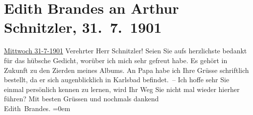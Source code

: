 

         
         \renewcommand{\erwaehntePersonen}{Personen: Georg Brandes}
         \renewcommand{\erwaehnteOrte}{Orte: Karlsbad, Vahrn, Wien}
         \renewcommand{\erwaehnteWerke}{}
               \section[Edith Brandes an Arthur Schnitzler, 31. 7. 1901]{ Edith Brandes an Arthur Schnitzler, 31. 7. 1901}\nopagebreak{}\rehead{ }\begin{ledgroupsized}[t]{13cm}\normalsize\beginnumbering \toendnotes[C]{\smallbreak\pagebreak[2]} 
\toendnotes[C]{\smallbreak}\pstart
           \raggedleft{}{\pb}\uline{Mittwoch 31-7-1901}\pend
           \pstart{}Verehrter Herr Schnitzler!\pend\pstart
           Seien Sie aufs herzlichste bedankt für das hübsche Gedicht, worüber ich mich sehr
               gefreut habe. Es gehört in Zukunft zu den Zierden meines Albums. An Papa habe ich Ihre Grüsse schriftlich
               bestellt, da er sich augenblicklich in Karlsbad
               befindet. –\pend
           \pstart
           {\pb}Ich hoffe sehr Sie einmal
               persönlich kennen zu lernen, wird Ihr Weg Sie nicht mal wieder hierher führen?\pend
           \pstart
           Mit besten Grüssen und nochmals dankend{\\[\baselineskip]}\spacefill\mbox{Edith Brandes.}\pend
           \leftskip=0em{}
         
         \endnumbering{}\end{ledgroupsized}  \newcommand{\dateiname}{L01155}\newcommand{\titel}{Edith Brandes an Arthur Schnitzler, 31. 7. 1901}\newcommand{\editorInnen}{Martin Anton Müller und Gerd-Hermann Susen}
      